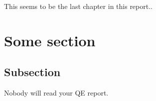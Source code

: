 This seems to be the last chapter in this report..

\section{Some section}

\subsection{Subsection}
Nobody will read your QE report.